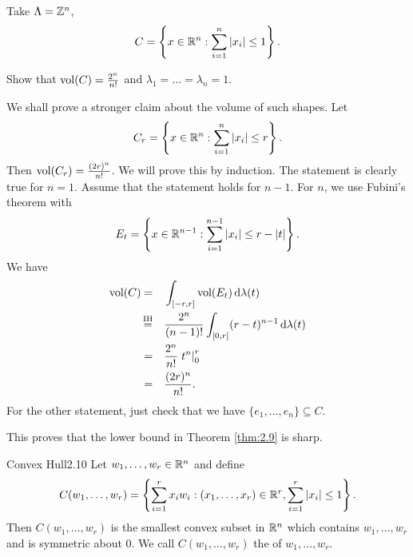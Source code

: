 \documentclass{Vorlesungstemplate_English} %
\begin{document}
    \begin{example}
      Take $\Lambda = \mathbb{Z}^n$, \[C = \left\{ x \in \mathbb{R}^n: \sum_{i=1}^n |x_i| \leq 1\right\}.\]
      \begin{exercise}{}{}
        Show that $\text{vol}(C) = \frac{2^n}{n!}$ and $\lambda_1 = \dots = \lambda_n = 1$.
      \end{exercise}
      \renewcommand{\pfcolor}{blue}
      \begin{colorpf}
        \color{blue} We shall prove a stronger claim about the volume of such shapes. Let \[C_r = \left\{ x \in \mathbb{R}^n:\sum_{i=1}^n |x_i| \leq r\right\}.\]
        Then $\text{vol}(C_r) = \frac{(2r)^n}{n!}$. We will prove this by induction. The statement is clearly true for $n=1$. Assume that the statement holds for $n-1$. For $n$, we use Fubini's theorem with \[E_{t} = \left\{ x \in \mathbb{R}^{n-1}: \sum_{i=1}^{n-1}|x_i| \leq r-|t| \right\}.\]
        We have
        \begin{align*}
          \vol(C) = \quad & \int_{[-r,r]} \vol(E_t) \dl{\lambda(t)} \\
          \stackrel{\text{IH}}{=} \quad & \frac{2^{n}}{(n-1)!}\int_{[0,r]} (r-t)^{n-1} \dl{\lambda(t)} \\
          = \quad & \frac{2^n}{n!}\Eval{t^n}{0}{r} \\
          = \quad & \frac{(2r)^n}{n!}.
        \end{align*}
        For the other statement, just check that we have $\{ e_1, \dots, e_n\} \subseteq C$.
      \end{colorpf}
      This proves that the lower bound in Theorem \ref{thm:2.9} is sharp.
    \end{example}
    \begin{lemma}{Convex Hull}{2.10}
    Let $w_1, \dots, w_r \in \mathbb{R}^n$ and define
    \[C(w_1, \dots, w_r) = \left\{ \sum_{i=1}^r x_iw_i: (x_1, \dots, x_r) \in \mathbb{R}^r, \sum_{i=1}^r |x_i|\leq 1\right\}.\]
    Then $C(w_1, \dots, w_r)$ is the smallest convex subset in $\mathbb{R}^n$ which contains $w_1, \dots, w_r$ and is symmetric about $0$.
    We call $C(w_1, \dots, w_r)$ the  of $w_1, \dots, w_r$.
    \end{lemma}
\end{document}
